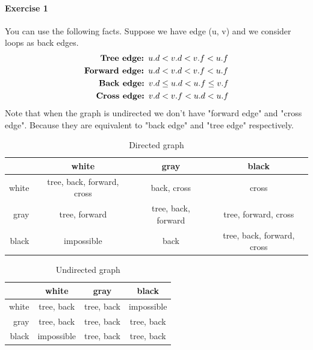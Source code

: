 \documentclass{book}
\begin{document}
	\paragraph{Exercise 1}
	You can use the following facts. Suppose we have edge (u, v) and we consider loops as back edges.
	\begin{align*}	
	\begin{split}
		\text{\textbf{Tree edge: }} u.d &< v.d < v.f < u.f \\
		\text{\textbf{Forward edge: }} u.d &< v.d < v.f < u.f \\
		\text{\textbf{Back edge: }} v.d &\le u.d < u.f \le v.f \\
		\text{\textbf{Cross edge: }} v.d &< v.f < u.d < u.f \\
	\end{split}
	\end{align*}
	Note that when the graph is undirected we don't have "forward edge" and "cross edge". Because they are equivalent to "back edge" and "tree edge" respectively.
	\begin{table}[h!]
		\centering
		\caption{Directed graph}
		\begin{tabular}{r|c|c|c}
			& white & gray & black \\
			\hline
			white & tree, back, forward, cross & back, cross & cross \\
			\hline
			gray & tree, forward  & tree, back, forward & tree, forward, cross \\
			\hline
			black & impossible & back & tree, back, forward, cross \\
		\end{tabular}
	\end{table}
	\begin{table}[h!]
		\centering
		\caption{Undirected graph}
		\begin{tabular}{r|c|c|c}
			& white & gray & black \\
			\hline
			white & tree, back & tree, back & impossible \\
			\hline
			gray & tree, back & tree, back & tree, back\\
			\hline
			black & impossible & tree, back & tree, back \\
		\end{tabular}
	\end{table}
	\FloatBarrier
\end{document}
